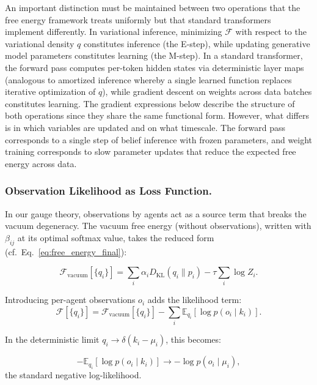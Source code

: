 \documentclass[twoside,11pt]{article}
\begin{document}
An important distinction must be maintained between two operations that the free energy framework treats uniformly but that standard transformers implement differently. In variational inference, minimizing $\mathcal{F}$ with respect to the variational density $q$ constitutes inference (the E-step), while updating generative model parameters constitutes learning (the M-step). In a standard transformer, the forward pass computes per-token hidden states via deterministic layer maps (analogous to amortized inference whereby a single learned function replaces iterative optimization of $q$), while gradient descent on weights across data batches constitutes learning. The gradient expressions below describe the structure of both operations since they share the same functional form. However, what differs is in which variables are updated and on what timescale. The forward pass corresponds to a single step of belief inference with frozen parameters, and weight training corresponds to slow parameter updates that reduce the expected free energy across data.

\subsubsection{Observation Likelihood as Loss Function.}

In our gauge theory, observations by agents act as a source term that breaks the vacuum degeneracy. The vacuum free energy (without observations), written with $\beta_{ij}$ at its optimal softmax value, takes the reduced form (cf.\ Eq.~\ref{eq:free_energy_final}):

\begin{equation}
\mathcal{F}_{\text{vacuum}}[\{q_i\}] = \sum_i \alpha_iD_{\mathrm{KL}}(q_i \| p_i) - \tau\sum_i\log Z_i.
\end{equation}

Introducing per-agent observations $o_i$ adds the likelihood term:
\begin{equation}
\mathcal{F}[\{q_i\}] = \mathcal{F}_{\text{vacuum}}[\{q_i\}] - \sum_i \mathbb{E}_{q_i}[\log p(o_i \mid k_i)].
\end{equation}

In the deterministic limit $q_i \to \delta(k_i - \mu_i)$, this becomes:

\begin{equation}
-\mathbb{E}_{q_i}[\log p(o_i \mid k_i)] \to -\log p(o_i \mid \mu_i),
\end{equation}
the standard negative log-likelihood.
\end{document}
